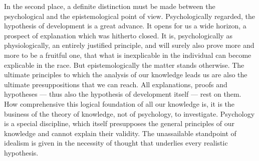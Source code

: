 \documentclass[12pt,a4paper]{book}
\begin{document}
In the second place, a definite distinction must be made between the
psychological and the epistemological point of view. Psychologically
regarded, the hypothesis of development is a great advance. It opens for
us a wide horizon, a prospect of explanation which was hitherto closed. It
is, psychologically as physiologically, an entirely justified principle,
and will surely also prove more and more to be a fruitful one, that what
is inexplicable in the individual can become explicable in the race. But
epistemologically the matter stands otherwise. The ultimate principles to
which the analysis of our knowledge leads us are also the ultimate
presuppositions that we can reach. All explanations, proofs and
hypotheses --- thus also the hypothesis of development itself --- rest on
them. How comprehensive this logical foundation of all our knowledge is,
it is the business of the theory of knowledge, not of psychology, to
investigate. Psychology is a special discipline, which itself presupposes
the general principles of our knowledge and cannot explain their validity.
The unassailable standpoint of idealism is given in the necessity of
thought that underlies every realistic hypothesis.
\end{document}

